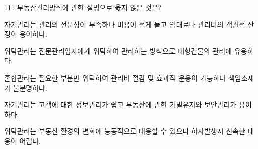 \begin{question}{111}
부동산관리방식에 관한 설명으로 옳지 않은 것은?
\begin{choices}
  \item 자기관리는 관리의 전문성이 부족하나 비용이 적게 들고 임대료나 관리비의 객관적 산정이 용이하다.
  \item 위탁관리는 전문관리업자에게 위탁하여 관리하는 방식으로 대형건물의 관리에 유용하다.
  \item 혼합관리는 필요한 부분만 위탁하여 관리비 절감 및 효과적 운용이 가능하나 책임소재가 불분명하다.
  \item 자기관리는 고객에 대한 정보관리가 쉽고 부동산에 관한 기밀유지와 보안관리가 용이하다.
  \item 위탁관리는 부동산 환경의 변화에 능동적으로 대응할 수 있으나 하자발생시 신속한 대응이 어렵다.
\end{choices}
\end{question}
